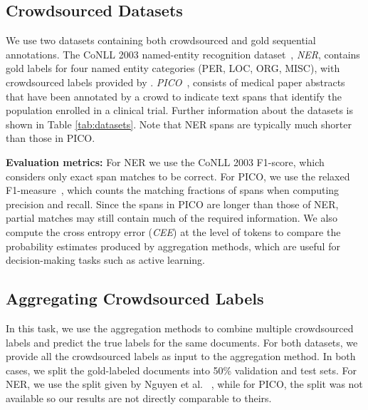 
\subsection{Crowdsourced Datasets}\label{sec:expts}

We use two datasets containing both crowdsourced and gold sequential annotations. 
The CoNLL 2003 named-entity recognition dataset~\cite{tjong2003introduction},
\emph{NER}, contains gold labels for four named entity categories (PER, LOC, ORG, MISC),
with crowdsourced labels provided by \cite{rodrigues2014sequence}.
\emph{PICO}~\cite{nguyen2017aggregating}, 
consists of medical paper abstracts that have been annotated by a crowd to indicate text spans that identify the population enrolled in a clinical trial. 
Further information about the datasets is shown in Table \ref{tab:datasets}. Note that NER spans are typically much shorter than those in PICO.

\textbf{Evaluation metrics:}
For NER we use the CoNLL 2003 F1-score, which considers only exact span matches %
to be correct. 
For PICO, we use the relaxed F1-measure~\cite{nguyen2017aggregating}, which counts the matching fractions of spans when computing precision and recall.
Since the spans in PICO are longer than those of NER, partial matches may still contain much of the required information. 
We also compute the cross entropy error (\emph{CEE}) at the level of tokens
to compare the probability estimates produced by aggregation methods, which are useful for decision-making tasks such as active learning.


\subsection{Aggregating Crowdsourced Labels}\label{sec:task1}

In this task, we use the aggregation methods to combine multiple crowdsourced labels and predict the true labels for the same documents. 
For both datasets, we provide all the crowdsourced labels as input to the aggregation method. 
In both cases, we split the gold-labeled documents into 50\% validation and test sets. 
For NER, we use the split given by Nguyen et al. ~,
while for PICO, the split was not available so our results are not directly comparable to theirs.

